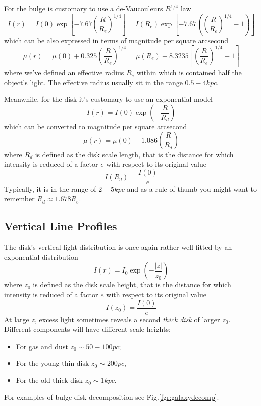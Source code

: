 For the bulge is customary to use a de-Vaucouleurs $R^{1/4}$ law
\begin{equation}
    I(r) = I(0)\exp\left[-7.67\left(\frac{R}{R_{e}}\right)^{1/4}\right]=I(R_{e})\exp\left[-7.67\left(\left(\frac{R}{R_{e}}\right)^{1/4}-1\right)\right]
    \label{eq:devaucouleurs}
\end{equation}
which can be also expressed in terms of magnitude per square arcsecond
\begin{equation}
    \mu(r) = \mu(0) +0.325\left(\frac{R}{R_{e}}\right)^{1/4} = \mu(R_{e})+8.3235\left[\left(\frac{R}{R_{e}}\right)^{1/4}-1\right] 
\end{equation}
where we've defined an effective radius $R_{e}$ within which is contained half the object's light. The effective radius usually sit in the range $0.5-4\unit{kpc}$.
\par Meanwhile, for the disk it's customary to use an exponential model
\begin{equation}
    I(r) = I(0)\exp\left(-\frac{R}{R_{d}}\right)
\end{equation}
which can be converted to magnitude per square arcsecond 
\begin{equation*}
    \mu(r) = \mu(0)+1.086\left(\frac{R}{R_{d}}\right)
\end{equation*}
where $R_{d}$ is defined as the disk scale length, that is the distance for which intensity is reduced of a factor $e$ with respect to its original value
\begin{equation*}
    I(R_{d}) = \frac{I(0)}{e}
\end{equation*}
Typically, it is in the range of $2-5\unit{kpc}$ and as a rule of thumb you might want to remember $R_{d} \approx 1.678R_{e}$.

\subsection*{Vertical Line Profiles}

The disk's vertical light distribution is once again rather well-fitted by an exponential distribution
\begin{equation}
    I(r) = I_{0}\exp\left(-\frac{|z|}{z_{0}}\right)
\end{equation}
where $z_{0}$ is defined as the disk scale height, that is the distance for which intensity is reduced of a factor $e$ with respect to its original value
\begin{equation*}
    I(z_{0}) = \frac{I(0)}{e}
\end{equation*}
At large $z$, excess light sometimes reveals a second \emph{thick disk} of larger $z_{0}$. Different components will have different scale heights:
\begin{itemize}
    \item For gas and dust $z_{0}\sim 50-100\unit{pc}$;
    \item For the young thin disk $z_{0}\sim 200 \unit{pc}$,
    \item For the old thick disk $z_{0}\sim 1\unit{kpc}$.
\end{itemize}
For examples of bulge-disk decomposition see Fig.\ref{fgr:galaxydecomp}.

